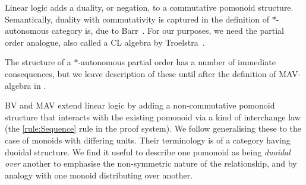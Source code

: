
Linear logic adds a duality, or negation, to a commutative
pomonoid structure. Semantically, duality with commutativity is
captured in the definition of $*$-autonomous category is, due to Barr~\cite{Barr_1979}. For our purposes, we need the partial order
analogue, also called a CL algebra by Troelstra~\cite{Troelstra92:lll}.


\begin{remark}
  The structure of a $*$-autonomous partial order has a number of
  immediate consequences, but we leave description of these until
  after the definition of MAV-algebra in .
\end{remark}

BV and MAV extend linear logic by adding a non-commutative pomonoid structure
that interacts with the existing pomonoid via a kind of interchange
law (the \cref{rule:Sequence} rule in the proof system). We follow
\cite{hopf-book} generalising these to the case of monoids with
differing units. Their terminology is of a category having duoidal
structure. We find it useful to describe one pomonoid as being
\emph{duoidal over} another to emphasise the non-symmetric nature of
the relationship, and by analogy with one monoid distributing over
another.


